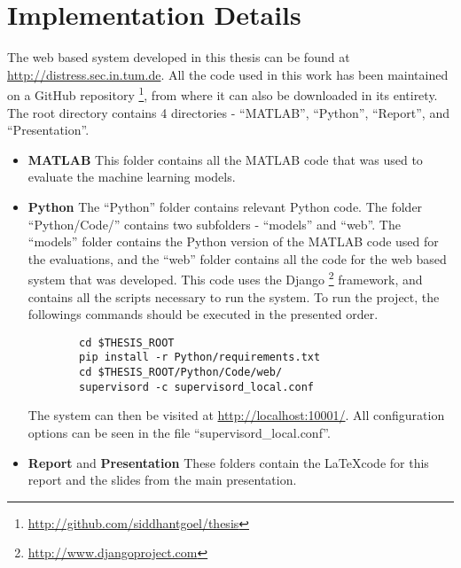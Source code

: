 \chapter{Implementation Details}
\label{chapter:Appendix}

The web based system developed in this thesis can be found at \url{http://distress.sec.in.tum.de}. All the code used in this work has been maintained on a GitHub repository \footnote{\url{http://github.com/siddhantgoel/thesis}}, from where it can also be downloaded in its entirety. The root directory contains 4 directories - ``MATLAB'', ``Python'', ``Report'', and ``Presentation''.

\begin{itemize}
    \item{\textbf{MATLAB} This folder contains all the MATLAB code that was used to evaluate the machine learning models.}
    \item{\textbf{Python} The ``Python'' folder contains relevant Python code. The folder ``Python/Code/'' contains two subfolders - ``models'' and ``web''. The ``models'' folder contains the Python version of the MATLAB code used for the evaluations, and the ``web'' folder contains all the code for the web based system that was developed. This code uses the Django \footnote{\url{http://www.djangoproject.com}} framework, and contains all the scripts necessary to run the system. To run the project, the followings commands should be executed in the presented order.
    \begin{verbatim}
        cd $THESIS_ROOT
        pip install -r Python/requirements.txt
        cd $THESIS_ROOT/Python/Code/web/
        supervisord -c supervisord_local.conf
    \end{verbatim}
    }
    The system can then be visited at \url{http://localhost:10001/}. All configuration options can be seen in the file ``supervisord\_local.conf''.
    \item{\textbf{Report} and \textbf{Presentation} These folders contain the \LaTeX code for this report and the slides from the main presentation.}
\end{itemize}
